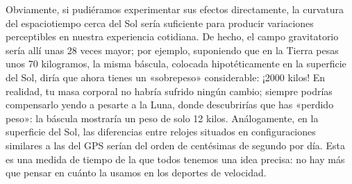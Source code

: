 Obviamente, si pudiéramos experimentar sus efectos directamente, la curvatura del
espaciotiempo cerca del Sol sería suficiente para producir variaciones perceptibles
en nuestra experiencia cotidiana. De hecho, el campo gravitatorio sería allí unas
28 veces mayor; por ejemplo, suponiendo que en la Tierra pesas unos 70 kilogramos,
la misma báscula, colocada hipotéticamente en la superficie del Sol, diría que
ahora tienes un «sobrepeso» considerable: ¡2000 kilos! En realidad, tu masa corporal
no habría sufrido ningún cambio; siempre podrías compensarlo yendo a pesarte a la
Luna, donde descubrirías que has «perdido peso»: la báscula mostraría un
peso de solo 12 kilos. Análogamente, en la superficie del Sol, las diferencias
entre relojes situados en configuraciones similares a las del GPS serían del orden
de centésimas de segundo por día. Esta es una medida de tiempo de la que todos
tenemos una idea precisa: no hay más que pensar en cuánto la usamos en los deportes
de velocidad.

